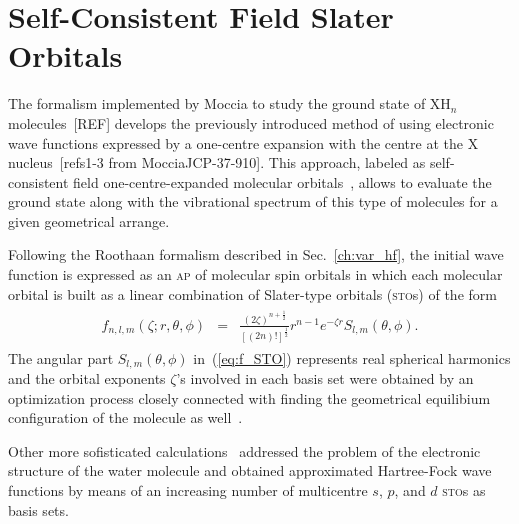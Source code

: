 


\section{Self-Consistent Field Slater Orbitals}
\label{ch:scf_sto}


The formalism implemented by Moccia to study the ground state of
XH$_{n}$ molecules~[REF] develops the previously introduced method of
using electronic wave functions expressed by a one-centre expansion
with the centre at the X nucleus~\cite{Parr_JCP_1960}[refs1-3 from
  MocciaJCP-37-910]. This approach, labeled as self-consistent field
one-centre-expanded molecular orbitals~\cite{Moccia_JCP_2164}, allows
to evaluate the ground state along with the vibrational spectrum of
this type of molecules for a given geometrical arrange.

Following the Roothaan formalism described in Sec.~\ref{ch:var_hf},
the initial wave function is expressed as an \textsc{ap} of molecular
spin orbitals in which each molecular orbital is built as a linear
combination of Slater-type orbitals (\textsc{sto}s) of the form
%
\begin{eqnarray}
  \begin{split}
    f_{n,l,m}(\zeta;r,\theta,\phi) & = &
    \frac{(2\zeta)^{n + \frac{1}{2}}}{[(2n)!]^{\frac{1}{2}}} r^{n-1} e^{-\zeta r}
    S_{l,m}(\theta,\phi).
  \end{split}
  \label{eq:f_STO}
\end{eqnarray}
%
The angular part $S_{l,m}(\theta,\phi)$ in~(\ref{eq:f_STO}) represents
real spherical harmonics and the orbital exponents $\zeta$'s involved
in each basis set were obtained by an optimization process closely
connected with finding the geometrical equilibium configuration of the
molecule as well~\cite{Moccia_JCP_2164,Moccia_1964}.


Other more sofisticated calculations~\cite{Pitzer_1968,Pitzer_1970}
addressed the problem of the electronic structure of the water
molecule and obtained approximated Hartree-Fock wave functions by
means of an increasing number of multicentre $s$, $p$, and $d$
\textsc{sto}s as basis sets.




